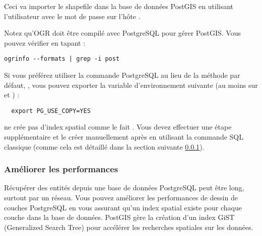 Ceci va importer le shapefile  dans la base de données PostGIS  en utilisant l'utilisateur  avec le mot de passe  sur l'hôte .

Notez qu'OGR doit être compilé avec PostgreSQL pour gérer PostGIS. Vous pouvez vérifier en tapant :
\begin{verbatim}
ogrinfo --formats | grep -i post
\end{verbatim}

Si vous préférez utiliser la commande PostgreSQL  au lieu de la méthode par défaut, , vous pouvez exporter la variable d'environnement suivante (au moins sur \nix et \osx) :
\begin{verbatim}
  export PG_USE_COPY=YES
\end{verbatim}

 ne crée pas d'index spatial comme le fait . Vous devez effectuer une étape supplémentaire et le créer manuellement après en utilisant la commande SQL classique  (comme cela est détaillé dans la section suivante \ref{label_improve}).

\subsubsection{Améliorer les performances} \label{label_improve}

Récupérer des entités depuis une base de données PostgreSQL peut être long, surtout par un réseau. Vous pouvez améliorer les performances de dessin de couches PostgreSQL en vous assurant qu'un  index spatial existe pour chaque couche dans la base de données. PostGIS gère la création d'un index  GiST (Generalized Search Tree) pour accélérer les recherches spatiales sur les données.

